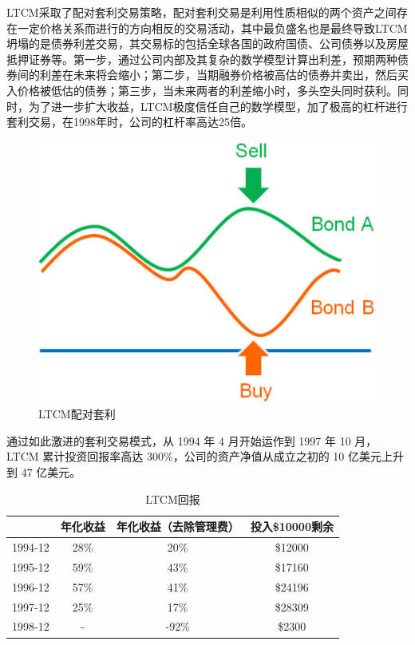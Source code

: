 LTCM采取了配对套利交易策略，配对套利交易是利用性质相似的两个资产之间存在一定价格关系而进行的方向相反的交易活动，其中最负盛名也是最终导致LTCM坍塌的是债券利差交易，其交易标的包括全球各国的政府国债、公司债券以及房屋抵押证券等。第一步，通过公司内部及其复杂的数学模型计算出利差，预期两种债券间的利差在未来将会缩小；第二步，当期融券价格被高估的债券并卖出，然后买入价格被低估的债券；第三步，当未来两者的利差缩小时，多头空头同时获利。同时，为了进一步扩大收益，LTCM极度信任自己的数学模型，加了极高的杠杆进行套利交易，在1998年时，公司的杠杆率高达25倍。
    \begin{figure}[H]
        \centering
        \includegraphics[width=\linewidth]{img/ltcm.jpg}
        \caption{LTCM配对套利}
    \end{figure}
    
通过如此激进的套利交易模式，从 1994 年 4 月开始运作到 1997 年 10 月，LTCM 累计投资回报率高达 300\%，公司的资产净值从成立之初的 10 亿美元上升到 47 亿美元。
    \begin{table}[H]
        \begin{tabular}{|c|ccc|}
        \hline
                & 年化收益 & 年化收益（去除管理费） & 投入\$10000剩余 \\\hline
        1994-12 & 28\% & 20\%        & \$12000     \\
        1995-12 & 59\% & 43\%        & \$17160     \\
        1996-12 & 57\% & 41\%        & \$24196     \\
        1997-12 & 25\% & 17\%        & \$28309     \\
        1998-12 & -    & -92\%       & \$2300     \\\hline
        \end{tabular}
        \caption{LTCM回报}
    \end{table}

